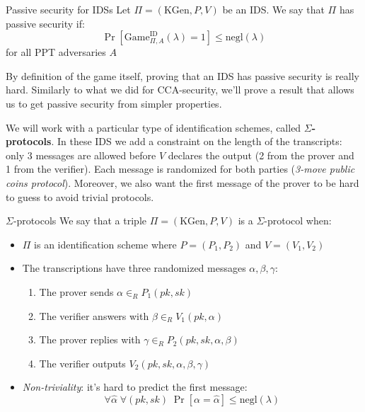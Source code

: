 \documentclass[a4paper, 12pt]{report}
\begin{document}
    \begin{frameddefn}{Passive security for IDSs}
        Let $\Pi = (\mathrm{KGen}, P, V)$ be an IDS. We say that $\Pi$ has passive security if:
        \[\Pr[\mathrm{Game}_{\Pi, A}^{\text{ID}}(\lambda) = 1] \leq \mathrm{negl}(\lambda)\]
        for all PPT adversaries $A$
    \end{frameddefn}

    By definition of the game itself, proving that an IDS has passive security is really hard. Similarly to what we did for CCA-security, we'll prove a result that allows us to get passive security from simpler properties. 

    We will work with a particular type of identification schemes, called \textbf{$\Sigma$-protocols}. In these IDS we add a constraint on the length of the transcripts: only 3 messages are allowed before $V$ declares the output (2 from the prover and 1 from the verifier). Each message is randomized for both parties (\textit{3-move public coins protocol}). Moreover, we also want the first message of the prover to be hard to guess to avoid trivial protocols.

    \begin{frameddefn}{$\Sigma$-protocols}
        We say that a triple $\Pi = (\mathrm{KGen}, P, V)$ is a $\Sigma$-protocol when:
        \begin{itemize}
            \item $\Pi$ is an identification scheme where $P = (P_1, P_2)$ and $V = (V_1, V_2)$
            \item The transcriptions have three randomized messages $\alpha,\beta,\gamma$:
            \begin{enumerate}
                \item The prover sends $\alpha \in_R P_1(pk,sk)$
                \item The verifier answers with $\beta \in_R V_1(pk, \alpha)$
                \item The prover replies with $\gamma \in_R P_2(pk, sk, \alpha, \beta)$
                \item The verifier outputs $V_2(pk, sk, \alpha, \beta, \gamma)$
            \end{enumerate} 
            \item \textit{Non-triviality}: it's hard to predict the first message:
            \[\forall \widehat \alpha \; \forall (pk, sk) \; \Pr[\alpha = \widehat \alpha] \leq \mathrm{negl}(\lambda)\]
        \end{itemize}
    \end{frameddefn}
    
\end{document}
